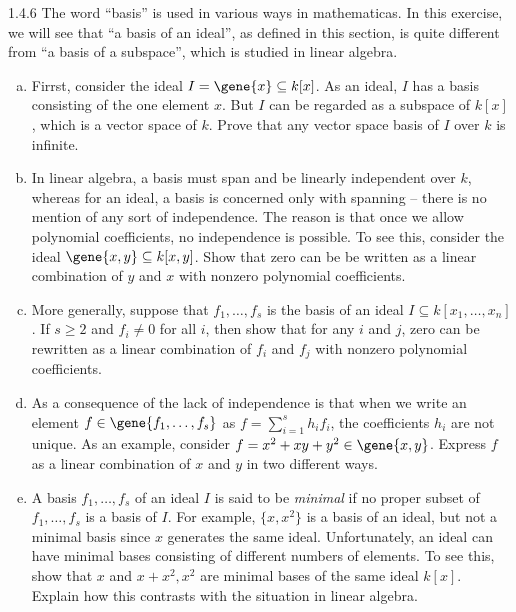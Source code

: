 \documentclass[twoside]{article}
\begin{document}
\begin{ejercicio}{1.4.6}
The word ``basis'' is used in various ways in mathematicas.
In this exercise, we will see that ``a basis of an ideal'', as defined in this section, is quite different from ``a basis of a subspace'', which is studied in linear algebra.
\begin{enumerate}[a.]
\item Firrst, consider the ideal $I = \gene{x} \subseteq k[x]$.
As an ideal, $I$ has a basis consisting of the one element $x$.
But $I$ can be regarded as a subspace of $k[x]$, which is a vector space of $k$.
Prove that any vector space basis of $I$ over $k$ is infinite.
\item In linear algebra, a basis must span and be linearly independent over $k$, whereas for an ideal, a basis is concerned only with spanning -- there is no mention of any sort of independence.
The reason is that once we allow polynomial coefficients, no independence is possible.
To see this, consider the ideal $\gene{x,y} \subseteq k[x,y]$.
Show that zero can be be written as a linear combination of $y$ and $x$ with nonzero polynomial coefficients.
\item More generally, suppose that $f_1,\dots,f_s$ is the basis of an ideal $I \subseteq k[x_1,\dots,x_n]$.
If $s ≥ 2$ and $f_i \neq 0$ for all $i$, then show that for any $i$ and $j$, zero can be rewritten as a linear combination of $f_i$ and $f_j$ with nonzero polynomial coefficients.
\item As a consequence of the lack of independence is that when we write an element $f \in \gene{f_1,\dots,f_s}$ as $f = \sum_{i=1}^s h_i f_i$, the coefficients $h_i$ are not unique.
As an example, consider $f = x^2 + xy + y^2 \in \gene{x,y}$.
Express $f$ as a linear combination of $x$ and $y$ in two different ways.
\item A basis $f_1,\dots,f_s$ of an ideal $I$ is said to be \emph{minimal} if no proper subset of $f_1,\dots,f_s$ is a basis of $I$. For example, $\{x,x^2\}$ is a basis of an ideal, but not a minimal basis since $x$ generates the same ideal.
Unfortunately, an ideal can have minimal bases consisting of different numbers of elements.
To see this, show that $x$ and $x+x^2,x^2$ are minimal bases of the same ideal $k[x]$. Explain how this contrasts with the situation in linear algebra.
\end{enumerate}
\end{ejercicio}
\end{document}
